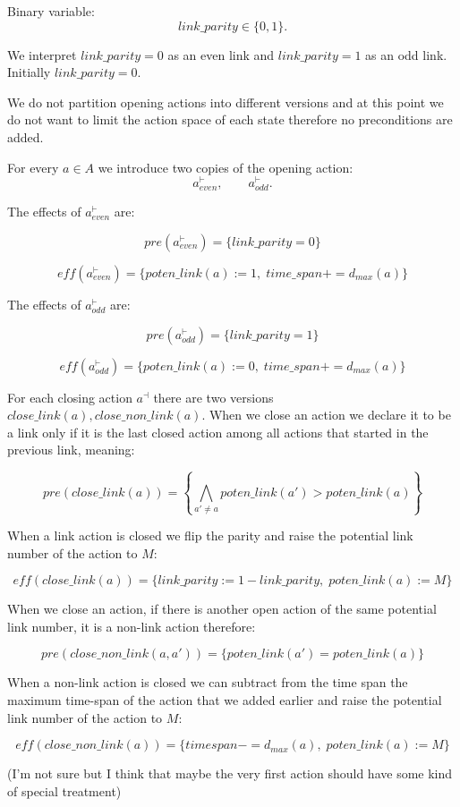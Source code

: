 \documentclass{article}
\begin{document}
Binary variable:
\[
link\_parity \in \{0,1\}.
\]

We interpret $link\_parity=0$ as an even link and $link\_parity=1$ as an odd link. Initially $link\_parity=0$.

We do not partition opening actions into different versions and at this point we do not want to limit the action space of each state therefore no preconditions are added.

For every $a\in A$ we introduce two copies of the opening action:
\[
a^{\vdash}_{even}, \qquad a^{\vdash}_{odd}.
\]

The effects of $a^{\vdash}_{even}$ are:
 
\[
pre(a^{\vdash}_{even}) = \{ link\_parity = 0 \}
\]

\[
eff(a^{\vdash}_{even})=\{ poten\_link(a) := 1,\; time\_span+=d_{max}(a)\}
\]

The effects of $a^{\vdash}_{odd}$ are:
 
\[
pre(a^{\vdash}_{odd}) = \{ link\_parity = 1 \}
\]

\[
eff(a^{\vdash}_{odd})=\{ poten\_link(a) := 0,\; time\_span+=d_{max}(a)\}
\]

For each closing action $a^\dashv$ there are two versions $close\_link(a), close\_non\_link(a)$.
When we close an action we declare it to be a link only if it is the last closed action among all actions that started in the previous link, meaning:

\[
pre(close\_link(a)) = \left\{\bigwedge_{a'\ne a} poten\_link(a') > poten\_link(a)\right\}
\]

When a link action is closed we flip the parity and raise the potential link number of the action to $M$:

\[
eff(close\_link(a)) = \{link\_parity := 1 - link\_parity,\; poten\_link(a):=M\}
\]

When we close an action, if there is another open action of the same potential link number, it is a non-link action therefore:

\[
pre(close\_non\_link(a, a')) = \{ poten\_link(a') = poten\_link(a)\}
\]

When a non-link action is closed we can subtract from the time span the maximum time-span of the action that we added earlier and raise the potential link number of the action to $M$:

\[
eff(close\_non\_link(a)) = \{ timespan -= d_{max}(a),\; poten\_link(a):=M\}
\]

(I'm not sure but I think that maybe the very first action should have some kind of special treatment)
\end{document}
